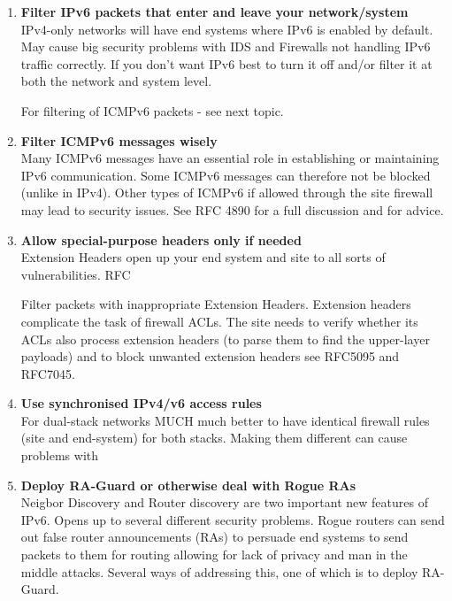 \begin{enumerate}
\item {\bf Filter IPv6 packets that enter and leave your network/system}\\
IPv4-only networks will have end systems where IPv6 is enabled by default. May cause big security problems with IDS and Firewalls not handling IPv6 traffic correctly. If you don't want IPv6 best to turn it off and/or filter it at both the network and system level.



For filtering of ICMPv6 packets - see next topic.


\item {\bf Filter ICMPv6 messages wisely} \\
Many ICMPv6 messages have an essential role in establishing or maintaining IPv6 communication. Some ICMPv6 messages can therefore not be blocked (unlike in IPv4). Other types of ICMPv6 if allowed through the site firewall may lead to security issues. See RFC 4890 for a full discussion and for advice.

\item {\bf Allow special-purpose headers only if needed} \\
Extension Headers open up your end system and site to all sorts of vulnerabilities. RFC

Filter packets with inappropriate Extension Headers. Extension headers complicate the task of firewall ACLs. The site needs to verify whether its ACLs also process extension headers (to parse them to find the upper-layer payloads) and to block unwanted extension headers see RFC5095 and RFC7045.


\item {\bf Use synchronised IPv4/v6 access rules} \\
For dual-stack networks MUCH much better to have identical firewall rules (site and end-system) for both stacks. Making them different can cause problems with



\item {\bf Deploy RA-Guard or otherwise deal with Rogue RAs} \\
Neigbor Discovery and Router discovery are two important new features of IPv6. Opens up to several different security problems. Rogue routers can send out false router announcements (RAs) to persuade end systems to send packets to them for routing allowing for lack of privacy and man in the middle attacks.  Several ways of addressing this, one of which is to deploy RA-Guard.



\end{enumerate}
